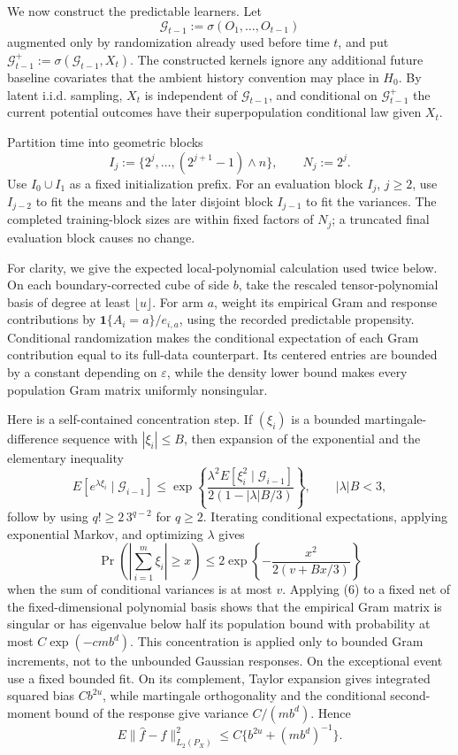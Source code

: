 We now construct the predictable learners.  Let
\[
\mathcal G_{t-1}:=\sigma(O_1,\ldots,O_{t-1})
\]
augmented only by randomization already used before time \(t\), and put
\(\mathcal G_{t-1}^{+}:=\sigma(\mathcal G_{t-1},X_t)\).  The constructed kernels ignore any additional future baseline covariates that the ambient history convention may place in \(H_0\).  By latent i.i.d. sampling, \(X_t\) is independent of \(\mathcal G_{t-1}\), and conditional on \(\mathcal G_{t-1}^{+}\) the current potential outcomes have their superpopulation conditional law given \(X_t\).

Partition time into geometric blocks
\[
I_j:=\{2^j,\ldots,(2^{j+1}-1)\wedge n\},
\qquad N_j:=2^j.
\tag{5}
\]
Use \(I_0\cup I_1\) as a fixed initialization prefix.  For an evaluation block \(I_j\), \(j\geq2\), use \(I_{j-2}\) to fit the means and the later disjoint block \(I_{j-1}\) to fit the variances.  The completed training-block sizes are within fixed factors of \(N_j\); a truncated final evaluation block causes no change.

For clarity, we give the expected local-polynomial calculation used twice below.  On each boundary-corrected cube of side \(b\), take the rescaled tensor-polynomial basis of degree at least \(\lfloor u\rfloor\).  For arm \(a\), weight its empirical Gram and response contributions by
\(\mathbf 1\{A_i=a\}/e_{i,a}\), using the recorded predictable propensity.  Conditional randomization makes the conditional expectation of each Gram contribution equal to its full-data counterpart.  Its centered entries are bounded by a constant depending on \(\varepsilon\), while the density lower bound makes every population Gram matrix uniformly nonsingular.

Here is a self-contained concentration step.  If \((\xi_i)\) is a bounded martingale-difference sequence with \(|\xi_i|\leq B\), then expansion of the exponential and the elementary inequality
\[
E[e^{\lambda\xi_i}\mid\mathcal G_{i-1}]
\leq
\exp\!\left\{
\frac{\lambda^2E[\xi_i^2\mid\mathcal G_{i-1}]}
{2(1-|\lambda|B/3)}
\right\},
\qquad |\lambda|B<3,
\]
follow by using \(q!\geq2\,3^{q-2}\) for \(q\geq2\).  Iterating conditional expectations, applying exponential Markov, and optimizing \(\lambda\) gives
\[
\Pr\!\left(\left|\sum_{i=1}^m\xi_i\right|\geq x\right)
\leq2\exp\!\left\{-\frac{x^2}{2(v+Bx/3)}\right\}
\tag{6}
\]
when the sum of conditional variances is at most \(v\).  Applying (6) to a fixed net of the fixed-dimensional polynomial basis shows that the empirical Gram matrix is singular or has eigenvalue below half its population bound with probability at most \(C\exp(-cmb^d)\).  This concentration is applied only to bounded Gram increments, not to the unbounded Gaussian responses.  On the exceptional event use a fixed bounded fit.  On its complement, Taylor expansion gives integrated squared bias \(Cb^{2u}\), while martingale orthogonality and the conditional second-moment bound of the response give variance \(C/(mb^d)\).  Hence
\[
E\|\widehat f-f\|_{L_2(P_X)}^2
\leq C\{b^{2u}+(mb^d)^{-1}\}.
\tag{7}
\]

